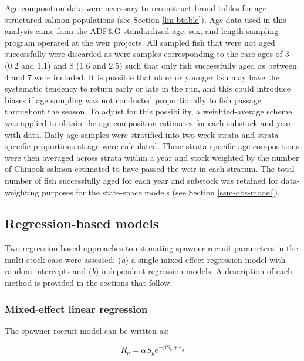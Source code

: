 \documentclass[12pt,]{book}
\theoremstyle{definition}
\theoremstyle{definition}
\theoremstyle{definition}
\theoremstyle{remark}
\begin{document}
Age composition data were necessary to reconstruct brood tables for
age-structured salmon populations (see Section \ref{lm-btable}). Age
data used in this analysis came from the ADF\&G standardized age, sex,
and length sampling program operated at the weir projects. All sampled
fish that were not aged successfully were discarded as were samples
corresponding to the rare ages of 3 (0.2 and 1.1) and 8 (1.6 and 2.5)
such that only fish successfully aged as between 4 and 7 were included.
It is possible that older or younger fish may have the systematic
tendency to return early or late in the run, and this could introduce
biases if age sampling was not conducted proportionally to fish passage
throughout the season. To adjust for this possibility, a
weighted-average scheme was applied to obtain the age composition
estimates for each substock and year with data. Daily age samples were
stratified into two-week strata and strata-specific proportions-at-age
were calculated. These strata-specific age compositions were then
averaged across strata within a year and stock weighted by the number of
Chinook salmon estimated to have passed the weir in each stratum. The
total number of fish successfully aged for each year and substock was
retained for data-weighting purposes for the state-space models (see
Section \ref{ssm-obs-model}).

\subsection{Regression-based models}\label{regression-based-models}

\noindent
Two regression-based approaches to estimating \citet{ricker-1954}
spawner-recruit parameters in the multi-stock case were assessed:
(\emph{a}) a single mixed-effect regression model with random intercepts
and (\emph{b}) independent regression models. A description of each
method is provided in the sections that follow.

\subsubsection{Mixed-effect linear
regression}\label{mixed-effect-linear-regression}

\noindent
The \citet{ricker-1954} spawner-recruit model can be written as:

\begin{equation}
  R_y=\alpha S_y e^{-\beta S_y + \varepsilon_y}
  \label{eq:basic-ricker}
\end{equation}
\end{document}
